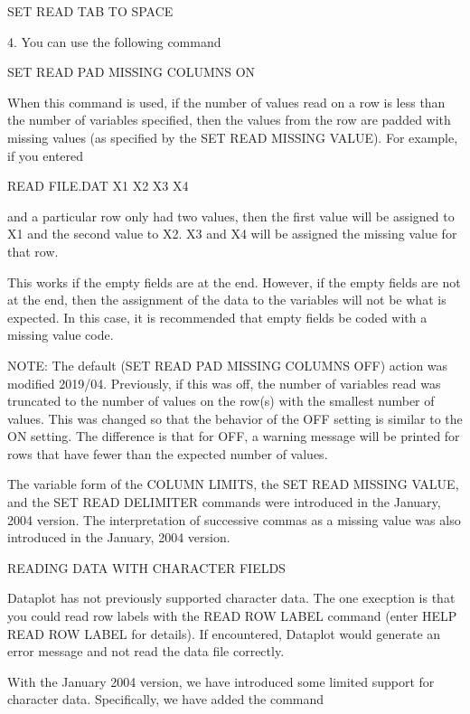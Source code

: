           SET READ TAB TO SPACE

    4. You can use the following command

           SET READ PAD MISSING COLUMNS ON

       When this command is used, if the number of values read on a row
       is less than the number of variables specified, then the
       values from the row are padded with missing values (as
       specified by the SET READ MISSING VALUE).  For example, if
       you entered

           READ FILE.DAT X1 X2 X3 X4

       and a particular row only had two values, then the first value
       will be assigned to X1 and the second value to X2.  X3 and X4
       will be assigned the missing value for that row.

       This works if the empty fields are at the end.  However, if
       the empty fields are not at the end, then the assignment of
       the data to the variables will not be what is expected.  In
       this case, it is recommended that empty fields be coded with
       a missing value code.

       NOTE: The default (SET READ PAD MISSING COLUMNS OFF) action
             was modified 2019/04.  Previously, if this was off,
             the number of variables read was truncated to the
             number of values on the row(s) with the smallest number
             of values.  This was changed so that the behavior of
             the OFF setting is similar to the ON setting.  The
             difference is that for OFF, a warning message will be
             printed for rows that have fewer than the expected
             number of values.

The variable form of the COLUMN LIMITS, the SET READ MISSING VALUE, and
the SET READ DELIMITER commands were introduced in the January, 2004
version.  The interpretation of successive commas as a missing value was
also introduced in the January, 2004 version.


READING DATA WITH CHARACTER FIELDS

Dataplot has not previously supported character data.  The one
execption is that you could read row labels with the READ ROW LABEL
command (enter HELP READ ROW LABEL for details).  If encountered,
Dataplot would generate an error message and not read the data file
correctly. 

With the January 2004 version, we have introduced some limited
support for character data.  Specifically, we have added the command

